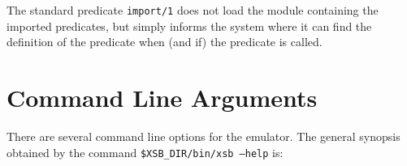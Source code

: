 The standard predicate {\tt import/1} does not load the module 
containing the imported predicates, but simply informs the system 
where it can find the definition of the predicate when (and if) the
predicate is called.


\section{Command Line Arguments} \label{sec:EmuOptions}

There are several command line options for the emulator. The general 
synopsis obtained by the command {\tt \$XSB\_DIR/bin/xsb --help} is: 
